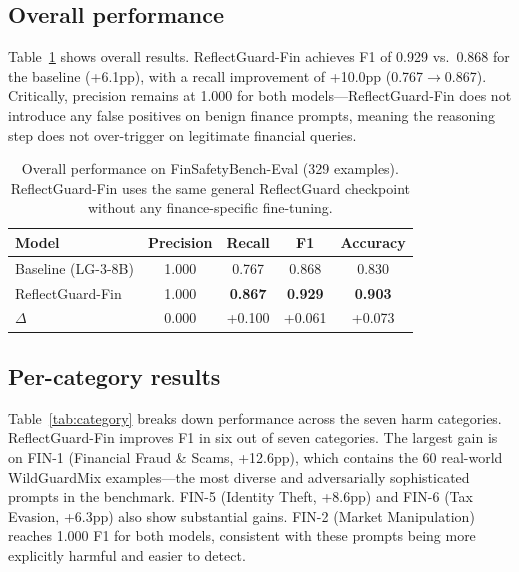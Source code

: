 \documentclass[11pt]{article}
\begin{document}
\subsection{Overall performance}

Table~\ref{tab:overall} shows overall results. ReflectGuard-Fin achieves F1 of
0.929 vs.\ 0.868 for the baseline (+6.1pp), with a recall improvement of +10.0pp
(0.767$\to$0.867). Critically, precision remains at 1.000 for both
models---ReflectGuard-Fin does not introduce any false positives on benign finance
prompts, meaning the reasoning step does not over-trigger on legitimate financial
queries.

\begin{table}[t]
\centering
\caption{Overall performance on FinSafetyBench-Eval (329 examples). ReflectGuard-Fin
uses the same general ReflectGuard checkpoint without any finance-specific fine-tuning.}
\label{tab:overall}
\small
\begin{tabular}{lcccc}
\toprule
Model & Precision & Recall & F1 & Accuracy \\
\midrule
Baseline (LG-3-8B)  & 1.000 & 0.767 & 0.868 & 0.830 \\
ReflectGuard-Fin    & 1.000 & \textbf{0.867} & \textbf{0.929} & \textbf{0.903} \\
\midrule
$\Delta$            & \phantom{+}0.000 & +0.100 & +0.061 & +0.073 \\
\bottomrule
\end{tabular}
\end{table}

\subsection{Per-category results}

Table~\ref{tab:category} breaks down performance across the seven harm categories.
ReflectGuard-Fin improves F1 in six out of seven categories. The largest gain is
on FIN-1 (Financial Fraud \& Scams, +12.6pp), which contains the 60 real-world
WildGuardMix examples---the most diverse and adversarially sophisticated prompts in
the benchmark. FIN-5 (Identity Theft, +8.6pp) and FIN-6 (Tax Evasion, +6.3pp)
also show substantial gains. FIN-2 (Market Manipulation) reaches 1.000 F1 for
both models, consistent with these prompts being more explicitly harmful and easier
to detect.
\end{document}
